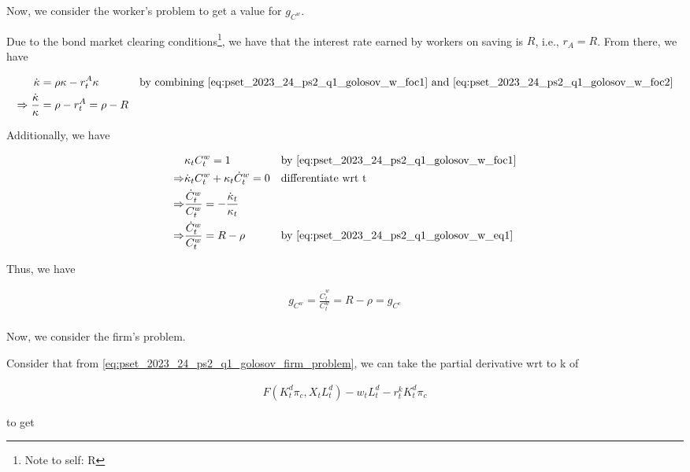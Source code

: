 Now, we consider the worker's problem to get a value for $g_{C^w}$.

Due to the bond market clearing conditions\footnote{Note to self: R}, 
we have that the interest rate earned by workers on saving is $R$, i.e., $r_A = R$.
From there, we have 

\begin{align}
    \dot{\kappa} &= \rho \kappa - r_t^A \kappa && \text{by combining \eqref{eq:pset_2023_24_ps2_q1_golosov_w_foc1} and \eqref{eq:pset_2023_24_ps2_q1_golosov_w_foc2}} \\
    \Rightarrow \frac{\dot{\kappa}}{\kappa} &= \rho - r_t^A = \rho - R \label{eq:pset_2023_24_ps2_q1_golosov_w_eq1} \\
\end{align}


Additionally, we have 

\begin{align}
    &\kappa_t C_t^w = 1 && \text{by \eqref{eq:pset_2023_24_ps2_q1_golosov_w_foc1}} \\
    \Rightarrow &\dot{\kappa}_t C_t^w + \kappa_t \dot{C}_t^w = 0 && \text{differentiate wrt t} \\
    \Rightarrow &\frac{\dot{C}_t^w}{C_t^w}= -\frac{\dot{\kappa}_t}{\kappa_t} \\
    \Rightarrow &\frac{\dot{C}_t^w}{C_t^w}= R - \rho && \text{by \eqref{eq:pset_2023_24_ps2_q1_golosov_w_eq1}} \\
\end{align}

Thus, we have 

\begin{align}
    g_{C^w} = \frac{\dot{C}_t^w}{C_t^w} = R - \rho = g_{C^c} \\
\end{align}

Now, we consider the firm's problem.

Consider that from \eqref{eq:pset_2023_24_ps2_q1_golosov_firm_problem}, we can 
take the partial derivative wrt to k of 

\begin{align}
    F(K_t^d\pi_c, X_t L_t^d) - w_tL^d_t - r^k_t K_t^d \pi_c
\end{align}

to get

